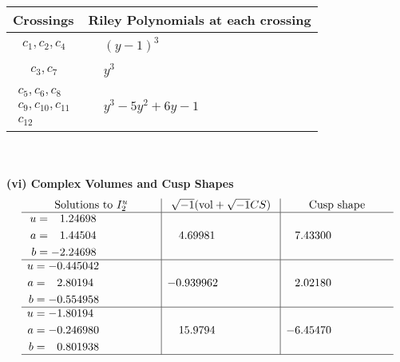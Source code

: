 \documentclass[1p]{elsarticle_modified}
\theoremstyle{definition}
\newcommand{\I}{\sqrt{-1}}
\begin{document}
\begin{tabular}{m{50pt}|m{274pt}}
Crossings & \hspace{64pt}Riley Polynomials at each crossing \\
\hline $$\begin{aligned}c_{1},c_{2},c_{4}\end{aligned}$$&$\begin{aligned}
&(y-1)^3
\end{aligned}$\\
\hline $$\begin{aligned}c_{3},c_{7}\end{aligned}$$&$\begin{aligned}
&y^3
\end{aligned}$\\
\hline $$\begin{aligned}c_{5},c_{6},c_{8}\\c_{9},c_{10},c_{11}\\c_{12}\end{aligned}$$&$\begin{aligned}
&y^3-5 y^2+6 y-1
\end{aligned}$\\
\hline
\end{tabular}\\~\\
\newpage\flushleft \textbf{(vi) Complex Volumes and Cusp Shapes}
$$\begin{array}{c|c|c}  
\text{Solutions to }I^u_{2}& \I (\text{vol} + \sqrt{-1}CS) & \text{Cusp shape}\\
 \hline 
\begin{aligned}
u &= \phantom{-}1.24698\phantom{ +0.000000I} \\
a &= \phantom{-}1.44504\phantom{ +0.000000I} \\
b &= -2.24698\phantom{ +0.000000I}\end{aligned}
 & \phantom{-}4.69981\phantom{ +0.000000I} & \phantom{-}7.43300\phantom{ +0.000000I} \\ \hline\begin{aligned}
u &= -0.445042\phantom{ +0.000000I} \\
a &= \phantom{-}2.80194\phantom{ +0.000000I} \\
b &= -0.554958\phantom{ +0.000000I}\end{aligned}
 & -0.939962\phantom{ +0.000000I} & \phantom{-}2.02180\phantom{ +0.000000I} \\ \hline\begin{aligned}
u &= -1.80194\phantom{ +0.000000I} \\
a &= -0.246980\phantom{ +0.000000I} \\
b &= \phantom{-}0.801938\phantom{ +0.000000I}\end{aligned}
 & \phantom{-}15.9794\phantom{ +0.000000I} & -6.45470\phantom{ +0.000000I}\\
 \hline 
 \end{array}$$\newpage
\end{document}
